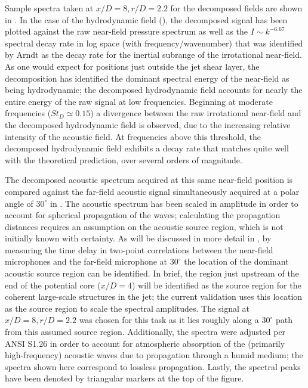 Sample spectra taken at $x/D = 8, r/D = 2.2$ for the decomposed fields are shown in .
In the case of the hydrodynamic field (), the decomposed signal has been plotted against the raw near-field pressure spectrum as well as the $I \sim k^{-6.67}$ spectral decay rate in log space (with frequency/wavenumber) that was identified by Arndt \etal \citep{Arndt1997} as the decay rate for the inertial subrange of the irrotational near-field.
As one would expect for positions just outside the jet shear layer, the decomposition has identified the dominant spectral energy of the near-field as being hydrodynamic; the decomposed hydrodynamic field accounts for nearly the entire energy of the raw signal at low frequencies.
Beginning at moderate frequencies ($St_D \simeq 0.15$) a divergence between the raw irrotational near-field and the decomposed hydrodynamic field is observed, due to the increasing relative intensity of the acoustic field.
At frequencies above this threshold, the decomposed hydrodynamic field exhibits a decay rate that matches quite well with the theoretical prediction, over several orders of magnitude. 

The decomposed acoustic spectrum acquired at this same near-field position is compared against the far-field acoustic signal simultaneously acquired at a polar angle of $30^\circ$ in .
The acoustic spectrum has been scaled in amplitude in order to account for spherical propagation of the waves; calculating the propagation distances requires an assumption on the acoustic source region, which is not initially known with certainty.
As will be discussed in more detail in , by measuring the time delay in two-point correlations between the near-field microphones and the far-field microphone at $30^\circ$ the location of the dominant acoustic source region can be identified. 
In brief, the region just upstream of the end of the potential core ($x/D =4$) will be identified as the source region for the coherent large-scale structures in the jet; the current validation uses this location as the source region to scale the spectral amplitudes.
The signal at $x/D = 8, r/D = 2.2$ was chosen for this task as it lies roughly along a $30^\circ$ path from this assumed source region.
Additionally, the spectra were adjusted per ANSI S1.26 \citep{ANS1995} in order to account for atmospheric absorption of the (primarily high-frequency) acoustic waves due to propagation through a humid medium; the spectra shown here correspond to lossless propagation.
Lastly, the spectral peaks have been denoted by triangular markers at the top of the figure. 

